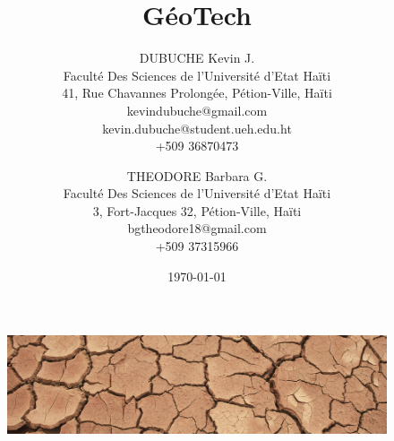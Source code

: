 \documentclass[a4paper,12pt]{report}
\begin{document}
\begin{figure}[t]
        \centering
        \includegraphics[width=1\textwidth]{image_fond}
        \label{image-GIS}
        \end{figure}

\title{GéoTech}
\author{
        DUBUCHE Kevin J. \\
        Faculté Des Sciences de l'Université d'Etat Haïti\\
        41, Rue Chavannes Prolongée, Pétion-Ville, Haïti\\
        kevindubuche@gmail.com\\
        kevin.dubuche@student.ueh.edu.ht\\
        +509 36870473
        \and
        THEODORE Barbara G.\\
        Faculté Des Sciences de l'Université d'Etat Haïti\\
        3, Fort-Jacques 32, Pétion-Ville, Haïti\\
        bgtheodore18@gmail.com\\
        +509 37315966

}
\date{\today}
\maketitle

\tableofcontents
\newpage
{}























\end{document}
